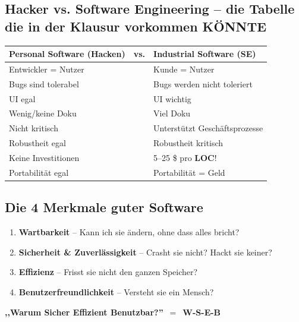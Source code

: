 \documentclass[11pt,a4paper]{article}
\renewcommand{\arraystretch}{1.25}
\begin{document}
\subsection{Hacker vs. Software Engineering -- die Tabelle die in der Klausur vorkommen KÖNNTE}

\begin{center}
\renewcommand{\arraystretch}{1.4}
\begin{tabularx}{\linewidth}{Xl X}
\toprule
\textbf{Personal Software (Hacken)} & \textbf{vs.} & \textbf{Industrial Software (SE)}\\
\midrule
Entwickler = Nutzer & & Kunde = Nutzer\\
Bugs sind tolerabel & & Bugs werden nicht toleriert\\
UI egal & & UI wichtig\\
Wenig/keine Doku & & Viel Doku\\
Nicht kritisch & & Unterstützt Geschäftsprozesse\\
Robustheit egal & & Robustheit kritisch\\
Keine Investitionen & & 5--25 \$ pro \textbf{LOC}!\\
Portabilität egal & & Portabilität = Geld\\
\bottomrule
\end{tabularx}
\end{center}

\subsection{Die 4 Merkmale guter Software}

\begin{keyfacts}
\begin{enumerate}
  \item \textbf{Wartbarkeit} -- Kann ich sie ändern, ohne dass alles bricht?
  \item \textbf{Sicherheit \& Zuverlässigkeit} -- Crasht sie nicht? Hackt sie keiner?
  \item \textbf{Effizienz} -- Frisst sie nicht den ganzen Speicher?
  \item \textbf{Benutzerfreundlichkeit} -- Versteht sie ein Mensch?
\end{enumerate}
\end{keyfacts}

\begin{merkhilfe}
\textbf{,,Warum Sicher Effizient Benutzbar?''} \,$=$\, \textbf{W-S-E-B}
\end{merkhilfe}
\end{document}
